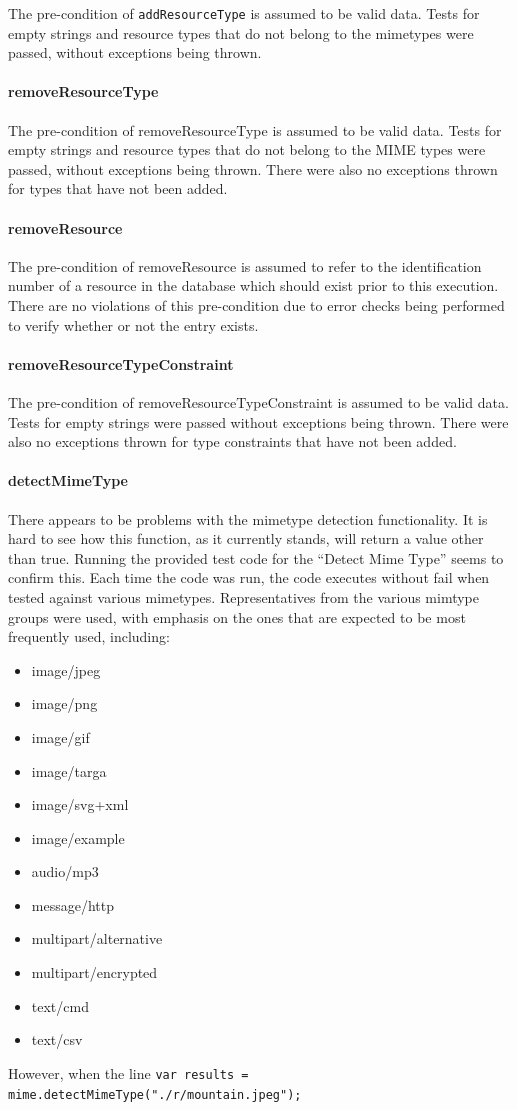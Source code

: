 \documentclass[a4paper]{article}
\begin{document}
The pre-condition of \texttt{addResourceType} is assumed to be valid data. Tests for empty strings and resource types that do not belong to the mimetypes were passed, without exceptions being thrown.


\paragraph{removeResourceType}
The pre-condition of removeResourceType is assumed to be valid data. Tests for empty strings and resource types that do not belong to the MIME types were passed, without exceptions being thrown. There were also no exceptions thrown for types that have not been added.

\paragraph{removeResource}
The pre-condition of removeResource is assumed to refer to the identification number of a resource in the database which should exist prior to this execution. There are no violations of this pre-condition due to error checks being performed to verify whether or not the entry exists.

\paragraph{removeResourceTypeConstraint}
The pre-condition of removeResourceTypeConstraint is assumed to be valid data. Tests for empty strings were passed without exceptions being thrown. There were also no exceptions thrown for type constraints that have not been added.

\paragraph{detectMimeType} 
There appears to be problems with the mimetype detection functionality. It is hard to see how this function, as it currently stands, will return a value other than true. Running the provided test code for the “Detect Mime Type” seems to confirm this. Each time the code was run, the code executes without fail when tested against various mimetypes. Representatives from the various mimtype groups were used, with emphasis on the ones that are expected to be most frequently used, including:
\begin{itemize}
\item image/jpeg
\item image/png
\item image/gif
\item image/targa
\item image/svg+xml
\item image/example
\item audio/mp3
\item message/http
\item multipart/alternative
\item multipart/encrypted
\item text/cmd
\item text/csv
\end{itemize}
However, when the line \texttt{var results = mime.detectMimeType("./r/mountain.jpeg");} 
\end{document}
